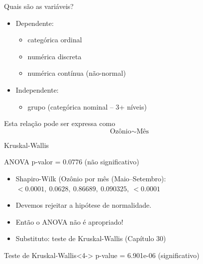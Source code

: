 \documentclass{beamer}
\begin{document}
\begin{frame}{Quais são as variáveis?}
  \begin{itemize}
    \small
  \item Dependente:
    \begin{itemize}
      \footnotesize
    \item categórica ordinal
    \item numérica discreta
    \item numérica contínua (não-normal)
    \end{itemize}
  \item Independente:
    \begin{itemize}
      \footnotesize
    \item grupo (categórica nominal -- 3+ níveis)
    \end{itemize}
  \end{itemize}
  \vfill
  \begin{block}{Esta relação pode ser expressa como}
    \begin{displaymath}
      \text{Ozônio} \sim \text{Mês}
    \end{displaymath}
  \end{block}
\end{frame}

\begin{frame}{Kruskal-Wallis}
  \begin{exampleblock}{ANOVA}
    \small
    p-valor = 0.0776 (não significativo)
  \end{exampleblock}
  \begin{itemize}
    \footnotesize
  \item<2-> Shapiro-Wilk (Ozônio por mês (Maio--Setembro): {\scriptsize $< 0.0001,\ 0.0628,\ 0.86689,\ 0.090325,\ < 0.0001$}
    \bigskip
  \item<3-> Devemos rejeitar a hipótese de normalidade.
  \item<3-> Então o ANOVA \alert{não é} apropriado!
  \item<3-> Substituto: teste de Kruskal-Wallis (Capítulo 30)
  \end{itemize}
  \bigskip
  \begin{exampleblock}{Teste de Kruskal-Wallis}<4->
    \small
    p-value = \alert{6.901e-06} (significativo)
  \end{exampleblock}
\end{frame}
\end{document}
